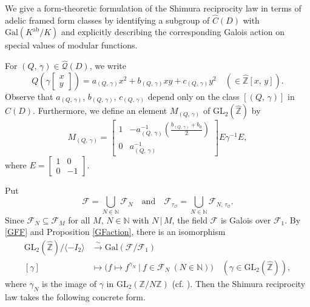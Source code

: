 \documentclass[reqno,11pt]{article}
\theoremstyle{plain} %
\theoremstyle{definition} %
\begin{document}
We give a form-theoretic formulation of the Shimura reciprocity law
in terms of adelic framed form classes by identifying a subgroup of $\widehat{C}(D)$ with 
$\mathrm{Gal}(K^\mathrm{ab}/K)$ and 
explicitly describing the corresponding Galois action on special values of modular functions.
\par
For $(Q,\,\gamma)\in\widehat{\mathcal{Q}}(D)$, we write
\begin{equation*}
Q\left(\gamma\begin{bmatrix}x\\y\end{bmatrix}\right)=
a_{(Q,\,\gamma)}x^2+b_{(Q,\,\gamma)}xy+c_{(Q,\,\gamma)}y^2\quad(\in\widehat{\mathbb{Z}}[x,\,y]). 
\end{equation*}
Observe that $a_{(Q,\,\gamma)}$, $b_{(Q,\,\gamma)}$, $c_{(Q,\,\gamma)}$ depend
only on the class $[(Q,\,\gamma)]$ in $\widehat{C}(D)$. 
Furthermore, we define an element $M_{(Q,\,\gamma)}$
of $\mathrm{GL}_2(\widehat{\mathbb{Z}})$ by 
\begin{equation}\label{MQ}
M_{(Q,\,\gamma)}=\begin{bmatrix}
1&-a_{(Q,\,\gamma)}^{-1}\left(\frac{b_{(Q,\,\gamma)}+b_0}{2}\right)\\0&a_{(Q,\,\gamma)}^{-1} 
\end{bmatrix}E\gamma^{-1}E,
\end{equation}
where $E=\begin{bmatrix}1&0\\0&-1\end{bmatrix}$. 
\par
Put
\begin{equation*}
\mathcal{F}=\bigcup_{N\in\mathbb{N}}\mathcal{F}_N
\quad\textrm{and}\quad
\mathcal{F}_{\tau_\mathcal{O}}=\bigcup_{N\in\mathbb{N}}\mathcal{F}_{N,\,
\tau_\mathcal{O}}. 
\end{equation*}
Since $\mathcal{F}_N\subseteq\mathcal{F}_M$ for all $M,\,N
\in\mathbb{N}$ with $N\,|\,M$, 
the field $\mathcal{F}$ is Galois over $\mathcal{F}_1$. 
By \eqref{GFF} and Proposition \ref{GFaction}, 
there is an isomorphism
\begin{align*}
\mathrm{GL}_2(\widehat{\mathbb{Z}})/\langle-I_2\rangle
&\stackrel{\sim}{\rightarrow}\mathrm{Gal}(\mathcal{F}/\mathcal{F}_1)\\
[\gamma]&\mapsto\bigg(
f\mapsto f^{\gamma_N}~|~f\in\mathcal{F}_N~(N\in\mathbb{N})\bigg)
\quad(\gamma\in\mathrm{GL}_2(\widehat{\mathbb{Z}})),
\end{align*}
where $\gamma_N$ is the image of $\gamma$ in 
$\mathrm{GL}_2(\mathbb{Z}/N\mathbb{Z})$
(cf. \cite[Proposition 6.21 and Theorem 6.23]{Shimura}).
Then the Shimura reciprocity law \cite[Theorem 6.31]{Shimura} takes
the following concrete form. 
\end{document}
